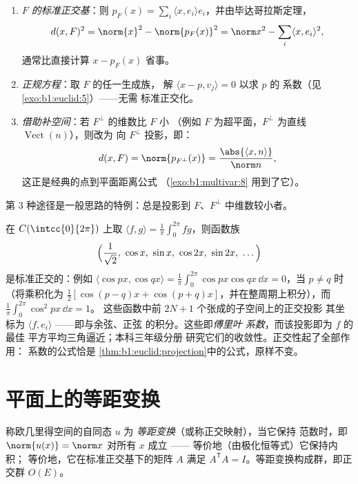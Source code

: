 \begin{method}
\label{met:b1:euclid:distance}
\begin{enumerate}
  \item \emph{$F$ 的标准正交基}：则 $p_F(x) = \sum_i
        \langle x, e_i\rangle e_i$，并由毕达哥拉斯定理，
        \[
        d(x, F)^2 = \norm{x}^2 - \norm{p_F(x)}^2
        = \norm x^2 - \sum_i \langle x, e_i\rangle^2 ,
        \]
        通常比直接计算 $x - p_F(x)$ 省事。
  \item \emph{正规方程}：取 $F$ 的任一生成族，
        解 $\langle x - p, v_j\rangle = 0$ 以求 $p$ 的
        系数（见\cref{exo:b1:euclid:5}）——无需
        标准正交化。
  \item \emph{借助补空间}：若 $F^\perp$ 的维数比 $F$ 小
        （例如 $F$ 为超平面，$F^\perp$ 为直线
        $\operatorname{Vect}(n)$），则改为
        向 $F^\perp$ 投影，即：
        \[
        d(x, F) = \norm{p_{F^\perp}(x)} =
        \frac{\abs{\langle x, n\rangle}}{\norm n} ,
        \]
        这正是经典的点到平面距离公式
        （\cref{exo:b1:multivar:8} 用到了它）。
\end{enumerate}
第 3 种途径是一般思路的特例：总是投影到
$F$、$F^\perp$ 中维数较小者。
\end{method}

\begin{example}
\label{ex:b1:euclid:trigortho}
在 $C(\intcc{0}{2\pi})$ 上取 $\langle f, g\rangle =
\frac1\pi\int_0^{2\pi} fg$，则函数族
\[
\Bigl(\frac{1}{\sqrt2},\ \cos x,\ \sin x,\ \cos 2x,\ \sin 2x,\
\dots\Bigr)
\]
是标准正交的：例如 $\langle \cos px, \cos qx\rangle =
\frac1\pi\int_0^{2\pi}\cos px\cos qx\,\dd x = 0$，当 $p \neq q$ 时
（将乘积化为 $\frac12[\cos(p{-}q)x +
\cos(p{+}q)x]$，并在整周期上积分），而
$\frac1\pi\int_0^{2\pi}\cos^2 px\,\dd x = 1$。
这些函数中前 $2N + 1$ 个张成的子空间上的正交投影
其坐标为 $\langle f, e_i\rangle$ ——即与余弦、正弦
的积分。这些即\emph{傅里叶
系数}，而该投影即为 $f$ 的最佳
平方平均三角逼近；本科三年级分册
研究它们的收敛性。正交性起了全部作用：
系数的公式恰是
\cref{thm:b1:euclid:projection}中的公式，原样不变。
\end{example}

\section{平面上的等距变换}

\begin{definition}\label{def:b1:euclid:isometry}
称欧几里得空间的自同态 $u$ 为
\emph{等距变换}（或称正交映射），当它保持
范数时，即 $\norm{u(x)} = \norm x$ 对所有 $x$ 成立 ——
等价地（由极化恒等式）它保持内积；
等价地，它在标准正交基下的矩阵 $A$ 满足
$A^{\mathsf T} A = I$。等距变换构成群，即正交群
$O(E)$。
\end{definition}

